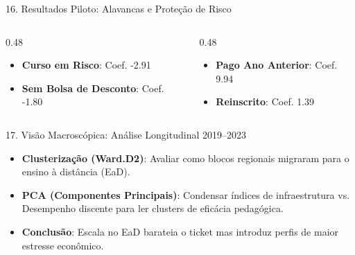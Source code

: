 \documentclass[10pt, aspectratio=169]{beamer}
\begin{document}
\begin{frame}{16. Resultados Piloto: Alavancas e Proteção de Risco}
    \begin{columns}[onlytextwidth]
        \begin{column}{0.48\textwidth}
            \begin{tcolorbox}[enhanced,title=Sinal de Risco (+),colback=black!30,colframe=red!80,fonttitle=\bfseries]
                \begin{itemize}
                    \item \textbf{Curso em Risco}: Coef. -2.91 
                    \item \textbf{Sem Bolsa de Desconto}: Coef. -1.80
                \end{itemize}
            \end{tcolorbox}
        \end{column}
        \begin{column}{0.48\textwidth}
            \begin{tcolorbox}[enhanced,title=Sinal de Proteção (+),colback=black!30,colframe=ArkosGreen,fonttitle=\bfseries]
                \begin{itemize}
                    \item \textbf{Pago Ano Anterior}: Coef. 9.94
                    \item \textbf{Reinscrito}: Coef. 1.39
                \end{itemize}
            \end{tcolorbox}
        \end{column}
    \end{columns}
\end{frame}

\begin{frame}{17. Visão Macroscópica: Análise Longitudinal 2019--2023}
    \begin{itemize}
        \item \textbf{Clusterização (Ward.D2)}: Avaliar como blocos regionais migraram para o ensino à distância (EaD).
        \item \textbf{PCA (Componentes Principais)}: Condensar índices de infraestrutura vs. Desempenho discente para ler clusters de eficácia pedagógica.
        \item \textbf{Conclusão}: Escala no EaD barateia o ticket mas introduz perfis de maior estresse econômico.
    \end{itemize}
\end{frame}
\end{document}
